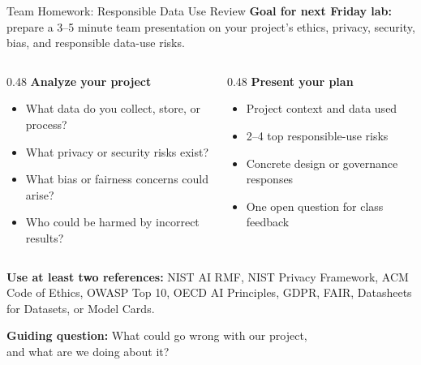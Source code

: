 \documentclass[aspectratio=43,12pt]{beamer}
\begin{document}
\begin{frame}{Team Homework: Responsible Data Use Review}
\footnotesize
\textbf{Goal for next Friday lab:} prepare a 3--5 minute team presentation on your project's ethics, privacy, security, bias, and responsible data-use risks.

\vspace{0.75em}
\begin{columns}[T,totalwidth=\textwidth]
\begin{column}{0.48\textwidth}
\textbf{Analyze your project}
\begin{itemize}
  \item What data do you collect, store, or process?
  \item What privacy or security risks exist?
  \item What bias or fairness concerns could arise?
  \item Who could be harmed by incorrect results?
\end{itemize}
\end{column}
\begin{column}{0.48\textwidth}
\textbf{Present your plan}
\begin{itemize}
  \item Project context and data used
  \item 2--4 top responsible-use risks
  \item Concrete design or governance responses
  \item One open question for class feedback
\end{itemize}
\end{column}
\end{columns}

\vspace{0.75em}
\textbf{Use at least two references:} NIST AI RMF, NIST Privacy Framework, ACM Code of Ethics, OWASP Top 10, OECD AI Principles, GDPR, FAIR, Datasheets for Datasets, or Model Cards.

\vspace{0.5em}
\centering
\textbf{Guiding question:} What could go wrong with our project,\\and what are we doing about it?
\end{frame}
\end{document}
